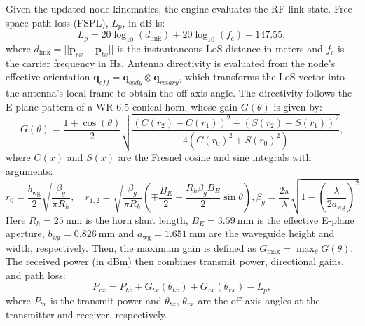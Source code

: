 \documentclass[fleqn,10pt]{wlscirep}
\begin{document}
Given the updated node kinematics, the engine evaluates the RF link state. Free-space path loss (FSPL), $L_p$, in dB is:
\begin{equation}
    L_{p} = 20 \log_{10}(d_{\text{link}}) + 20 \log_{10}(f_c) - 147.55,
\end{equation}
where $d_{\text{link}} = ||\mathbf{p}_{rx} - \mathbf{p}_{tx}||$ is the instantaneous LoS distance in meters and $f_c$ is the carrier frequency in Hz. Antenna directivity is evaluated from the node's effective orientation $\mathbf{q}_{eff} = \mathbf{q}_{body} \otimes \mathbf{q}_{rotary}$, which transforms the LoS vector into the antenna's local frame to obtain the off-axis angle. The directivity follows the E-plane pattern of a WR-6.5 conical horn, whose gain $G(\theta)$ is given by:
\begin{equation}
    G(\theta) = \frac{1 + \cos(\theta)}{2} \sqrt{\frac{(C(r_2) - C(r_1))^2 + (S(r_2) - S(r_1))^2}{4(C(r_0)^2 + S(r_0)^2)}},
\end{equation}
where $C(x)$ and $S(x)$ are the Fresnel cosine and sine integrals with arguments:
\begin{equation}
    r_0 = \frac{b_\mathrm{wg}}{2}\sqrt{\frac{\beta_g}{\pi R_h}}, \quad
    r_{1,2} = \sqrt{\frac{\beta_g}{\pi R_h}}\left(\mp\frac{B_E}{2} - \frac{R_h \beta_g B_E}{2}\sin\theta\right),
    \beta_g = \frac{2\pi}{\lambda}\sqrt{1-\left(\frac{\lambda}{2a_\mathrm{wg}}\right)^2}
\end{equation}
Here $R_h = \SI{25}{\milli\meter}$ is the horn slant length, $B_E = \SI{3.59}{\milli\meter}$ is the effective E-plane aperture, $b_\mathrm{wg} = \SI{0.826}{\milli\meter}$ and $a_\mathrm{wg} = \SI{1.651}{\milli\meter}$ are the waveguide height and width, respectively. Then, the maximum gain is defined as $G_\mathrm{max} = \max_{\theta} G(\theta)$. The received power (in dBm) then combines transmit power, directional gains, and path loss:
\begin{equation}
P_{rx} = P_{tx} + G_{tx}(\theta_{tx}) + G_{rx}(\theta_{rx}) - L_p,
\end{equation}
where $P_{tx}$ is the transmit power and $\theta_{tx}$, $\theta_{rx}$ are the off-axis angles at the transmitter and receiver, respectively.
\end{document}
